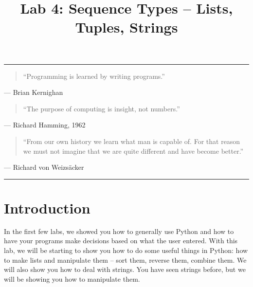 \documentclass[11pt]{cselabheader}
\title{Lab 4: Sequence Types -- Lists, Tuples, Strings}
\begin{document}
\maketitle
{}
\hrule

\begin{quotation}
``Programming is learned by writing programs.''
\end{quotation}
\begin{flushright}
--- Brian Kernighan
\end{flushright}

\begin{quotation}
``The purpose of computing is insight, not numbers.''
\end{quotation}
\begin{flushright}
--- Richard Hamming, 1962
\end{flushright}

\begin{quotation}
  ``From our own history we learn what man is capable of. For that reason we
  must not imagine that we are quite different and have become better.''
\end{quotation}
\begin{flushright}
  --- Richard von Weizs\"{a}cker
\end{flushright}
\hrule

\section*{Introduction}

In the first few labs, we showed you how to generally use Python and how to
have your programs make decisions based on what the user entered. With this
lab, we will be starting to show you how to do some useful things in Python:
how to make lists and manipulate them -- sort them, reverse them, combine them.
We will also show you how to deal with strings. You have seen strings before,
but we will be showing you how to manipulate them.

\pagebreak
\end{document}
